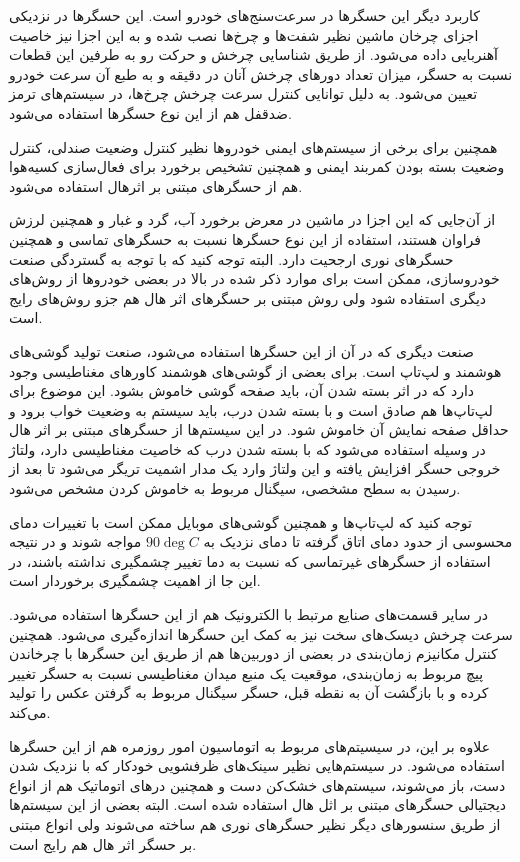 \documentclass[conference]{IEEEtran-ModifiedForMVIP}
\begin{document}
کاربرد دیگر این حسگرها در سرعت‌سنج‌های خودرو 
است. این حسگر‌ها در نزدیکی اجزای چرخان ماشین نظیر شفت‌ها و چرخ‌ها نصب شده و به این اجزا نیز خاصیت آهنربایی داده می‌شود. از طریق شناسایی چرخش و حرکت رو به طرفین این قطعات نسبت به حسگر، میزان تعداد دور‌های چرخش آنان در دقیقه و به طبع آن سرعت خودرو تعیین می‌شود.  \cite{rs} به دلیل توانایی کنترل سرعت چرخش چرخ‌ها، در سیستم‌های ترمز ضدقفل
هم از این نوع حسگر‌ها استفاده می‌شود.
\cite{magnelink}

همچنین برای برخی از سیستم‌های ایمنی خودروها نظیر کنترل وضعیت صندلی، کنترل وضعیت بسته بودن کمربند ایمنی و همچنین تشخیص برخورد برای فعال‌سازی کسیه‌هوا هم از حسگرهای مبتنی بر اثرهال استفاده می‌شود. \cite{magnelink}

از آن‌جایی که این اجزا در ماشین در معرض برخورد آب، گرد و غبار و همچنین لرزش فراوان هستند، استفاده از این نوع حسگر‌ها نسبت به حسگر‌های تماسی و همچنین حسگر‌های نوری ارجحیت دارد. البته توجه کنید که با توجه به گستردگی صنعت خودروسازی، ممکن است برای موارد ذکر شده در بالا در بعضی خودروها از روش‌های دیگری استفاده شود ولی روش مبتنی بر حسگر‌های اثر‌ هال هم جزو روش‌های رایج است. 

صنعت دیگری که در آن از این حسگرها استفاده می‌شود، صنعت تولید گوشی‌های هوشمند و لپ‌تاپ است. برای بعضی از گوشی‌های هوشمند کاور‌های مغناطیسی وجود دارد که در اثر بسته شدن آن، باید صفحه گوشی خاموش بشود. این موضوع برای لپ‌تاپ‌ها هم صادق است و با بسته شدن درب، باید سیستم به وضعیت خواب برود و حداقل صفحه نمایش آن خاموش شود. در این سیستم‌ها از حسگرهای مبتنی بر اثر هال در وسیله استفاده می‌شود که با بسته شدن درب که خاصیت مغناطیسی دارد، ولتاژ خروجی حسگر افزایش یافته و این ولتاژ وارد یک مدار اشمیت تریگر می‌شود تا بعد از رسیدن به سطح مشخصی، سیگنال مربوط به خاموش کردن مشخص می‌شود. \cite{rs}

توجه کنید که لپ‌تاپ‌ها و همچنین گوشی‌های موبایل ممکن است با تغییرات دمای محسوسی از حدود دمای اتاق گرفته تا دمای نزدیک به $90\deg C$ مواجه شوند و در نتیجه استفاده از حسگر‌های غیرتماسی که نسبت به دما تغییر چشمگیری نداشته باشند، در این جا از اهمیت چشمگیری برخوردار است.

در سایر قسمت‌های صنایع مرتبط با الکترونیک هم از این حسگر‌ها استفاده می‌شود. سرعت چرخش دیسک‌های سخت
نیز به کمک این حسگر‌ها اندازه‌گیری می‌شود. همچنین کنترل مکانیزم زمان‌بندی در بعضی از دوربین‌ها هم از طریق این حسگرها با چرخاندن پیچ مربوط به زمان‌بندی، موقعیت یک منبع میدان مغناطیسی نسبت به حسگر تغییر کرده و با بازگشت آن به نقطه قبل، حسگر سیگنال مربوط به گرفتن عکس را تولید می‌کند.
\cite{magnelink}

علاوه بر این، در سیسیتم‌های مربوط به اتوماسیون امور روزمره هم از این حسگر‌ها استفاده می‌شود. در سیستم‌هایی نظیر سینک‌های ظرفشویی خودکار که با نزدیک شدن دست، باز می‌شوند، سیستم‌های خشک‌کن دست و همچنین درهای اتوماتیک هم از انواع دیجتیالی حسگر‌های مبتنی بر اثل هال استفاده شده است. البته بعضی از این سیستم‌ها از طریق سنسور‌های دیگر نظیر حسگر‌های نوری هم ساخته می‌شوند ولی انواع مبتنی بر حسگر اثر هال هم رایج است.
\cite{magnelink}
\end{document}
